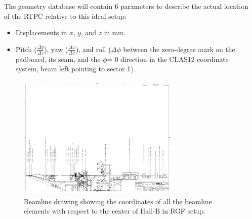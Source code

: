 \documentclass[12pt]{article}
\begin{document}
The geometry database will contain 6 parameters to describe the actual location 
of the RTPC relative to this ideal setup:
\begin{itemize}
   \item Displacements in $x$, $y$, and $z$ in mm.
    \item Pitch ($\frac{\Delta y}{\Delta z}$), yaw ($\frac{\Delta x}{\Delta 
       z}$), and roll ($\Delta \phi$ between the zero-degree mark on the 
       padboard, its seam, and the $\phi$= 0 direction in the CLAS12 coordinate 
       system, beam left pointing to sector 1).
\end{itemize}


\begin{figure}[h!]
  \begin{center}
    \includegraphics[angle=-90, width=0.7\textwidth,clip,
     trim=0mm 0mm 0mm 300mm]{figures/BF2001-02-00-0000_-_PDF.pdf}
     \caption{Beamline drawing showing the coordinates of all the beamline 
     elements with respect to the center of Hall-B in RGF setup.}
    \label{fig:bonus12-hallb}
  \end{center}
\end{figure}
\end{document}
